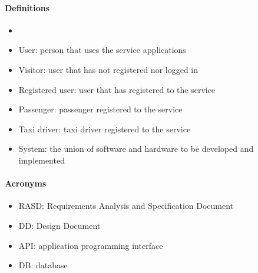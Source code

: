 \paragraph{Definitions}
\begin{itemize}
	\item 
	\item User: person that uses the service applications
	\item Visitor: user that has not registered nor logged in
	\item Registered user: user that has registered to the service
	\item Passenger: passenger registered to the service
	\item Taxi driver: taxi driver registered to the service
	\item System: the union of software and hardware to be developed and implemented
\end{itemize}
\paragraph{Acronyms}
\begin{itemize}
	\item RASD: Requirements Analysis and Specification Document
	\item DD: Design Document
	\item API: application programming interface
	\item DB: database
\end{itemize}